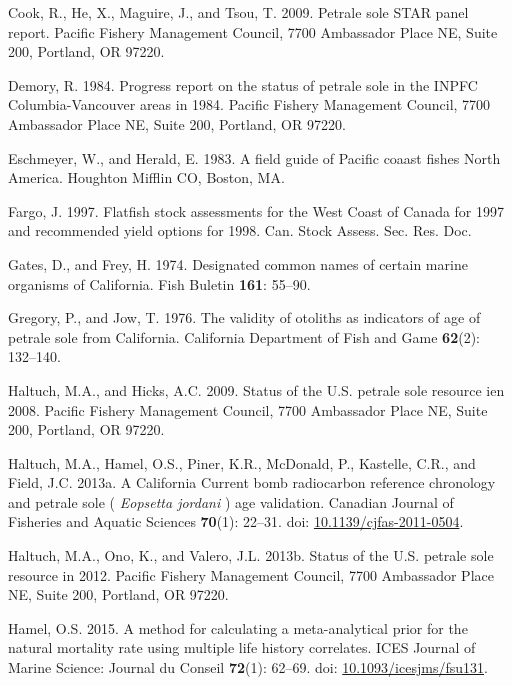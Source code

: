 \documentclass[12pt,]{article}
\begin{document}
\hypertarget{ref-cook_petrale_2009}{}
Cook, R., He, X., Maguire, J., and Tsou, T. 2009. Petrale sole STAR
panel report. Pacific Fishery Management Council, 7700 Ambassador Place
NE, Suite 200, Portland, OR 97220.

\hypertarget{ref-demory_progress_1984}{}
Demory, R. 1984. Progress report on the status of petrale sole in the
INPFC Columbia-Vancouver areas in 1984. Pacific Fishery Management
Council, 7700 Ambassador Place NE, Suite 200, Portland, OR 97220.

\hypertarget{ref-eschmeyer_field_1983}{}
Eschmeyer, W., and Herald, E. 1983. A field guide of Pacific coaast
fishes North America. Houghton Mifflin CO, Boston, MA.

\hypertarget{ref-fargo_j.j._flatfish_1997}{}
Fargo, J. 1997. Flatfish stock assessments for the West Coast of Canada
for 1997 and recommended yield options for 1998. Can. Stock Assess. Sec.
Res. Doc.

\hypertarget{ref-gates_designated_1974}{}
Gates, D., and Frey, H. 1974. Designated common names of certain marine
organisms of California. Fish Buletin \textbf{161}: 55--90.

\hypertarget{ref-gregory_validity_1976}{}
Gregory, P., and Jow, T. 1976. The validity of otoliths as indicators of
age of petrale sole from California. California Department of Fish and
Game \textbf{62}(2): 132--140.

\hypertarget{ref-haltuch_status_2009}{}
Haltuch, M.A., and Hicks, A.C. 2009. Status of the U.S. petrale sole
resource ien 2008. Pacific Fishery Management Council, 7700 Ambassador
Place NE, Suite 200, Portland, OR 97220.

\hypertarget{ref-haltuch_california_2013}{}
Haltuch, M.A., Hamel, O.S., Piner, K.R., McDonald, P., Kastelle, C.R.,
and Field, J.C. 2013a. A California Current bomb radiocarbon reference
chronology and petrale sole ( \emph{Eopsetta jordani} ) age validation.
Canadian Journal of Fisheries and Aquatic Sciences \textbf{70}(1):
22--31. doi:
\href{https://doi.org/10.1139/cjfas-2011-0504}{10.1139/cjfas-2011-0504}.

\hypertarget{ref-haltuch_status_2013}{}
Haltuch, M.A., Ono, K., and Valero, J.L. 2013b. Status of the U.S.
petrale sole resource in 2012. Pacific Fishery Management Council, 7700
Ambassador Place NE, Suite 200, Portland, OR 97220.

\hypertarget{ref-hamel_method_2015}{}
Hamel, O.S. 2015. A method for calculating a meta-analytical prior for
the natural mortality rate using multiple life history correlates. ICES
Journal of Marine Science: Journal du Conseil \textbf{72}(1): 62--69.
doi:
\href{https://doi.org/10.1093/icesjms/fsu131}{10.1093/icesjms/fsu131}.
\end{document}
